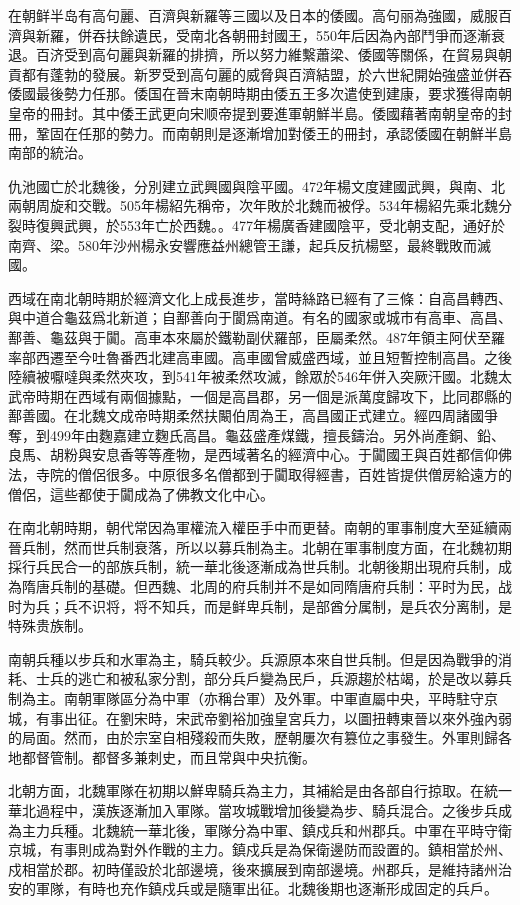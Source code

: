 在朝鲜半岛有高句麗、百濟與新羅等三國以及日本的倭國。高句丽為強國，威服百濟與新羅，併吞扶餘遺民，受南北各朝冊封國王，550年后因為內部鬥爭而逐漸衰退。百济受到高句麗與新羅的排擠，所以努力維繫蕭梁、倭國等關係，在貿易與朝貢都有蓬勃的發展。新罗受到高句麗的威脅與百濟結盟，於六世紀開始強盛並併吞倭國最後勢力任那。倭国在晉末南朝時期由倭五王多次遣使到建康，要求獲得南朝皇帝的冊封。其中倭王武更向宋顺帝提到要進軍朝鮮半島。倭國藉著南朝皇帝的封冊，鞏固在任那的勢力。而南朝則是逐漸增加對倭王的冊封，承認倭國在朝鮮半島南部的統治。

仇池國亡於北魏後，分別建立武興國與陰平國。472年楊文度建國武興，與南、北兩朝周旋和交戰。505年楊紹先稱帝，次年敗於北魏而被俘。534年楊紹先乘北魏分裂時復興武興，於553年亡於西魏。。477年楊廣香建國陰平，受北朝支配，通好於南齊、梁。580年沙州楊永安響應益州總管王謙，起兵反抗楊堅，最終戰敗而滅國。

西域在南北朝時期於經濟文化上成長進步，當時絲路已經有了三條：自高昌轉西、與中道合龜茲爲北新道；自鄯善向于閬爲南道。有名的國家或城市有高車、高昌、鄯善、龜茲與于闐。高車本來屬於鐵勒副伏羅部，臣屬柔然。487年領主阿伏至羅率部西遷至今吐魯番西北建高車國。高車國曾威盛西域，並且短暫控制高昌。之後陸續被嚈噠與柔然夾攻，到541年被柔然攻滅，餘眾於546年併入突厥汗國。北魏太武帝時期在西域有兩個據點，一個是高昌郡，另一個是派萬度歸攻下，比同郡縣的鄯善國。在北魏文成帝時期柔然扶闞伯周為王，高昌國正式建立。經四周諸國爭奪，到499年由麴嘉建立麴氏高昌。龜茲盛產煤鐵，擅長鑄治。另外尚產銅、鉛、良馬、胡粉與安息香等等產物，是西域著名的經濟中心。于闐國王與百姓都信仰佛法，寺院的僧侶很多。中原很多名僧都到于闐取得經書，百姓皆提供僧房給遠方的僧侶，這些都使于闐成為了佛教文化中心。

在南北朝時期，朝代常因為軍權流入權臣手中而更替。南朝的軍事制度大至延續兩晉兵制，然而世兵制衰落，所以以募兵制為主。北朝在軍事制度方面，在北魏初期採行兵民合一的部族兵制，統一華北後逐漸成為世兵制。北朝後期出現府兵制，成為隋唐兵制的基礎。但西魏、北周的府兵制并不是如同隋唐府兵制：平时为民，战时为兵；兵不识将，将不知兵，而是鲜卑兵制，是部酋分属制，是兵农分离制，是特殊贵族制。

南朝兵種以步兵和水軍為主，騎兵較少。兵源原本來自世兵制。但是因為戰爭的消耗、士兵的逃亡和被私家分割，部分兵戶變為民戶，兵源趨於枯竭，於是改以募兵制為主。南朝軍隊區分為中軍（亦稱台軍）及外軍。中軍直屬中央，平時駐守京城，有事出征。在劉宋時，宋武帝劉裕加強皇宮兵力，以圖扭轉東晉以來外強內弱的局面。然而，由於宗室自相殘殺而失敗，歷朝屢次有篡位之事發生。外軍則歸各地都督管制。都督多兼刺史，而且常與中央抗衡。

北朝方面，北魏軍隊在初期以鮮卑騎兵為主力，其補給是由各部自行掠取。在統一華北過程中，漢族逐漸加入軍隊。當攻城戰增加後變為步、騎兵混合。之後步兵成為主力兵種。北魏統一華北後，軍隊分為中軍、鎮戍兵和州郡兵。中軍在平時守衛京城，有事則成為對外作戰的主力。鎮戍兵是為保衛邊防而設置的。鎮相當於州、戍相當於郡。初時僅設於北部邊境，後來擴展到南部邊境。州郡兵，是維持諸州治安的軍隊，有時也充作鎮戍兵或是隨軍出征。北魏後期也逐漸形成固定的兵戶。


